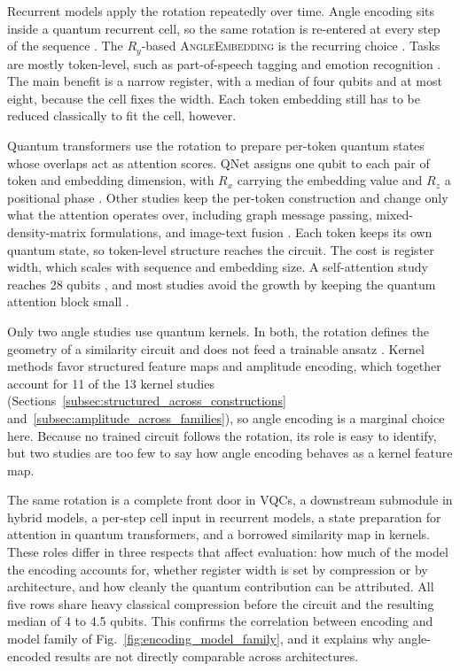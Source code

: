 \documentclass{ieeeaccess}
\begin{document}
Recurrent models apply the rotation repeatedly over time. Angle encoding sits inside a quantum recurrent cell, so the same rotation is re-entered at every step of the sequence \cite{stein_applying_2023,kesiku_quantum_2025,yu_application_2024,diaz-ortiz_strongly_2024}.
The $R_y$-based \textsc{AngleEmbedding} is the recurring choice \cite{kesiku_quantum_2025}. Tasks are mostly token-level, such as part-of-speech tagging and emotion recognition \cite{pandey_quantum_2026,pandey_quantum_2023,rawat_mental_2026,vm_hybrid_2026,xu_quantum_2024}.
The main benefit is a narrow register, with a median of four qubits and at most eight, because the cell fixes the width. Each token embedding still has to be reduced classically to fit the cell, however.

Quantum transformers use the rotation to prepare per-token quantum states whose overlaps act as attention scores.
QNet assigns one qubit to each pair of token and embedding dimension, with $R_x$ carrying the embedding value and $R_z$ a positional phase \cite{day_qnet_2023}. Other studies keep the per-token construction and change only what the attention operates over, including graph message passing, mixed-density-matrix formulations, and image-text fusion \cite{li_quantum_2024,aktar_quantum_2025,chen_quantum_2025,wu_multimodal_2025}.
Each token keeps its own quantum state, so token-level structure reaches the circuit. The cost is register width, which scales with sequence and embedding size. A self-attention study reaches 28 qubits \cite{he_training_2024}, and most studies avoid the growth by keeping the quantum attention block small \cite{di_sipio_dawn_2022,pham_fitqt_2026}.

Only two angle studies use quantum kernels. In both, the rotation defines the geometry of a similarity circuit and does not feed a trainable ansatz \cite{hsu_quantum_2025,boopalamani_quantum-enhanced_2025}.
Kernel methods favor structured feature maps and amplitude encoding, which together account for 11 of the 13 kernel studies (Sections~\ref{subsec:structured_across_constructions} and~\ref{subsec:amplitude_across_families}), so angle encoding is a marginal choice here.
Because no trained circuit follows the rotation, its role is easy to identify, but two studies are too few to say how angle encoding behaves as a kernel feature map.

The same rotation is a complete front door in VQCs, a downstream submodule in hybrid models, a per-step cell input in recurrent models, a state preparation for attention in quantum transformers, and a borrowed similarity map in kernels. These roles differ in three respects that affect evaluation: how much of the model the encoding accounts for, whether register width is set by compression or by architecture, and how cleanly the quantum contribution can be attributed. All five rows share heavy classical compression before the circuit and the resulting median of 4 to 4.5 qubits. This confirms the correlation between encoding and model family of Fig.~\ref{fig:encoding_model_family}, and it explains why angle-encoded results are not directly comparable across architectures.
\end{document}
